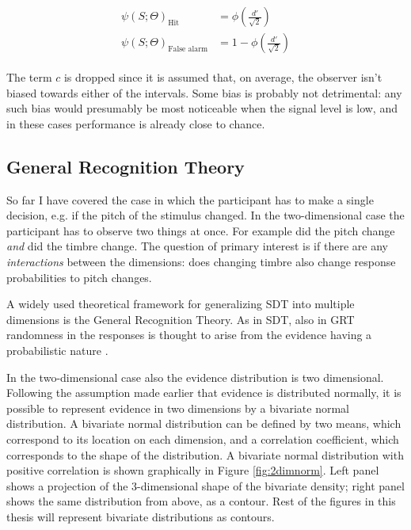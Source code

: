 \documentclass{article}\usepackage{knitr}
\begin{document}
\begin{align*}
\begin{split}
\psi(S; \Theta)_{\text{Hit}} &= \phi(\frac{d'}{\sqrt{2}}) \\
\psi(S; \Theta)_{\text{False alarm}} &=  1 - \phi(\frac{d'}{\sqrt{2}})
\end{split}
\end{align*}

The term $c$ is dropped since it is assumed that, on average, the observer isn't biased towards either of the intervals. Some bias is probably not detrimental: any such bias would presumably be most noticeable when the signal level is low, and in these cases performance is already close to chance. 



\subsection{General Recognition Theory}
\label{sec:grt_mdls}

So far I have covered the case in which the participant has to make a single decision, e.g. if the pitch of the stimulus changed. In the two-dimensional case the participant has to observe two things at once. For example did the pitch change \textit{and} did the timbre change. The question of primary interest is if there are any \textit{interactions} between the dimensions: does changing timbre also change response probabilities to pitch changes.

A widely used theoretical framework for generalizing SDT into multiple dimensions is the General Recognition Theory. As in SDT, also in GRT randomness in the responses is thought to arise from the evidence having a probabilistic nature \citep{ashby1986, ashby2015, kadlec1992}. 

In the two-dimensional case also the evidence distribution is two dimensional. Following the assumption made earlier that evidence is distributed normally, it is possible to represent evidence in two dimensions by a bivariate normal distribution. A bivariate normal distribution can be defined by two means, which correspond to its location on each dimension, and a correlation coefficient, which corresponds to the shape of the distribution. A bivariate normal distribution with positive correlation is shown graphically in Figure \ref{fig:2dimnorm}. Left panel shows a projection of the 3-dimensional shape of the bivariate density; right panel shows the same distribution from above, as a contour. Rest of the figures in this thesis will represent bivariate distributions as contours.
\end{document}
